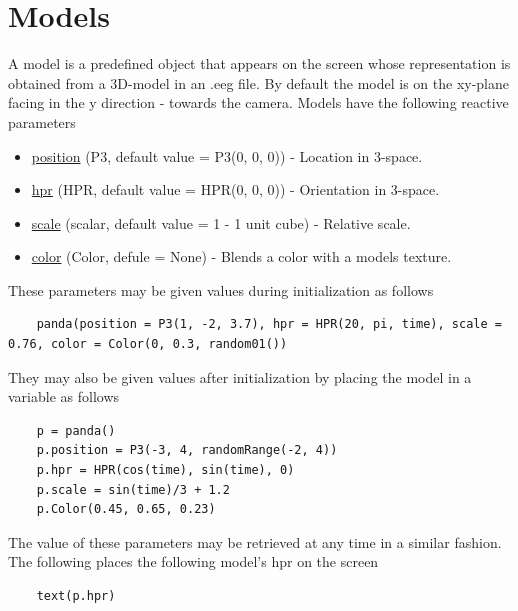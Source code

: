 \documentclass[10pt]{article}
\begin{document}
\section*{Models}
A model is a predefined object that appears on the screen whose representation is obtained from a 3D-model in an .eeg file.
By default the model is on the xy-plane facing in the y direction - towards the camera.
Models have the following reactive parameters
\begin{itemize}
    \item \underline{position} (P3, default value = P3(0, 0, 0)) - Location in 3-space.
    \item \underline{hpr} (HPR, default value = HPR(0, 0, 0)) - Orientation in 3-space.
    \item \underline{scale} (scalar, default value = 1 - 1 unit cube) - Relative scale.
    \item \underline{color} (Color, defule = None) - Blends a color with a models texture.
\end{itemize}
These parameters may be given values during initialization as follows
\begin{lstlisting}
    panda(position = P3(1, -2, 3.7), hpr = HPR(20, pi, time), scale = 0.76, color = Color(0, 0.3, random01())
\end{lstlisting}
They may also be given values after initialization by placing the model in a variable as follows
\begin{lstlisting}
    p = panda()
    p.position = P3(-3, 4, randomRange(-2, 4))
    p.hpr = HPR(cos(time), sin(time), 0)
    p.scale = sin(time)/3 + 1.2
    p.Color(0.45, 0.65, 0.23)
\end{lstlisting}
The value of these parameters may be retrieved at any time in a similar fashion.
The following places the following model's hpr on the screen
\begin{lstlisting}
    text(p.hpr)
\end{lstlisting}
\end{document}
